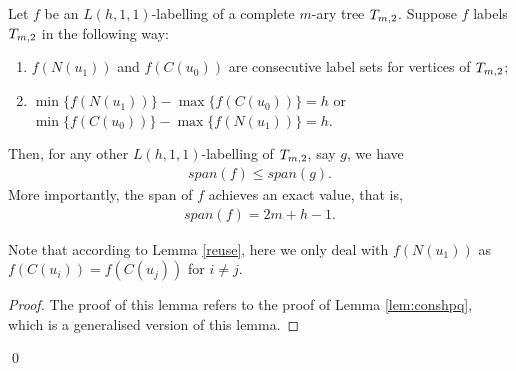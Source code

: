 \begin{lemma}
\label{lem:consh11} Let $f$ be an $L(h,1,1)$-labelling of a complete $m$-ary tree $\tm2$. Suppose $f$ labels $\tm2$ in the following way: 
\begin{enumerate}[(1)]
\item $f(N(u_1))$ and $f(C(u_0))$ are consecutive label sets for vertices of $\tm2$;
\item $\min \{f(N(u_1))\} - \max\{f(C(u_0))\} = h$ or $\min\{f(C(u_0))\} - \max\{f(N(u_1))\} = h$.
\end{enumerate}
Then, for any other $L(h,1,1)$-labelling of $\tm2$, say $g$, we have 
\begin{align}
\label{minimum}
span(f) \le span(g). 
\end{align}
More importantly, the span of $f$ achieves an exact value, that is, 
\begin{align}
\label{exact} 
span(f)= 2m+h-1. 
\end{align}
\end{lemma}

Note that according to Lemma \ref{reuse}, here we only deal with $f(N(u_1))$ as $f(C(u_i)) = f(C(u_j))$ for $i \neq j$.
\\
\begin{proof}
The proof of this lemma refers to the proof of Lemma \ref{lem:conshpq}, which is a generalised version of this lemma. 
\end{proof}
\qed
\\




